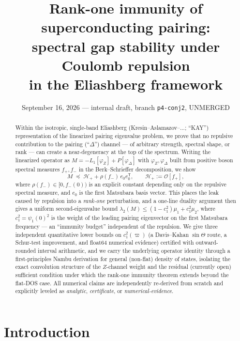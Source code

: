 \documentclass[11pt]{article}
\title{Rank-one immunity of superconducting pairing:\\
spectral gap stability under Coulomb repulsion\\
in the Eliashberg framework}
\author{}
\date{September 16, 2026 --- internal draft, branch \texttt{p4-conj2}, UNMERGED}
\newcommand{\HH}{\mathcal{H}}
\newcommand{\OO}{\mathcal{O}}
\begin{document}
\maketitle

\begin{abstract}
Within the isotropic, single-band Eliashberg (Kresin--Aslamazov--...; ``KAY'')
representation of the linearized pairing eigenvalue problem, we prove that no
repulsive contribution to the pairing (``$\Delta$'') channel --- of arbitrary
strength, spectral shape, or rank --- can create a near-degeneracy at the top
of the spectrum. Writing the linearized operator as
$M=-L_1[\varphi_Z]+P[\varphi_\Delta]$ with $\varphi_Z,\varphi_\Delta$ built from
positive boson spectral measures $f_+,f_-$ in the Berk--Schrieffer decomposition,
we show
\[
 M \;\preceq\; \HH_+ + \rho(f_-)\,e_0 e_0^{\mathsf T},\qquad \HH_+:=\OO[f_+],
\]
where $\rho(f_-)\in[0,f_-(0))$ is an explicit constant depending only on the
repulsive spectral measure, and $e_0$ is the first Matsubara basis vector. This
places the leak caused by repulsion into a \emph{rank-one} perturbation, and a
one-line duality argument then gives a uniform second-eigenvalue bound
$\lambda_2(M)\le(1-c_1^2)\mu_1+c_1^2\mu_2$, where $c_1^2=\psi_1(0)^2$ is the
weight of the leading pairing eigenvector on the first Matsubara frequency ---
an ``immunity budget'' independent of the repulsion. We give three
independent quantitative lower bounds on $c_1^2(\varpi)$ (a
Davis--Kahan $\sin\Theta$ route, a Schur-test improvement, and float64
numerical evidence) certified with outward-rounded interval arithmetic, and we
carry the underlying operator identity through a first-principles Nambu
derivation for general (non-flat) density of states, isolating the exact
convolution structure of the $Z$-channel weight and the residual (currently
open) sufficient condition under which the rank-one immunity theorem extends
beyond the flat-DOS case. All numerical claims are independently
re-derived from scratch and explicitly leveled as \emph{analytic},
\emph{certificate}, or \emph{numerical-evidence}.
\end{abstract}

\tableofcontents

\section{Introduction}
\end{document}
